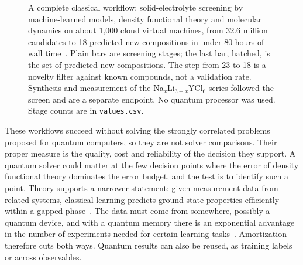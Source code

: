 \documentclass[10pt,a4paper]{article}
\begin{document}
\begin{figure}[htbp]
\centering
{}
\caption[An AI+HPC workflow: solid-electrolyte screening]{A complete classical workflow: solid-electrolyte screening by machine-learned models, density functional theory and molecular dynamics on about 1{,}000 cloud virtual machines, from 32.6 million candidates to 18 predicted new compositions in under 80 hours of wall time~\cite{chen2024}. Plain bars are screening stages; the last bar, hatched, is the set of predicted new compositions. The step from 23 to 18 is a novelty filter against known compounds, not a validation rate. Synthesis and measurement of the Na$_x$Li$_{3-x}$YCl$_6$ series followed the screen and are a separate endpoint. No quantum processor was used. Stage counts are in \texttt{values.csv}.}
\label{fig:funnel}
\end{figure}

These workflows succeed without solving the strongly correlated problems proposed for quantum computers, so they are not solver comparisons. Their proper measure is the quality, cost and reliability of the decision they support. A quantum solver could matter at the few decision points where the error of density functional theory dominates the error budget, and the test is to identify such a point. Theory supports a narrower statement: given measurement data from related systems, classical learning predicts ground-state properties efficiently within a gapped phase~\cite{huang2022}. The data must come from somewhere, possibly a quantum device, and with a quantum memory there is an exponential advantage in the number of experiments needed for certain learning tasks~\cite{huang2022exp}. Amortization therefore cuts both ways. Quantum results can also be reused, as training labels or across observables.
\end{document}
